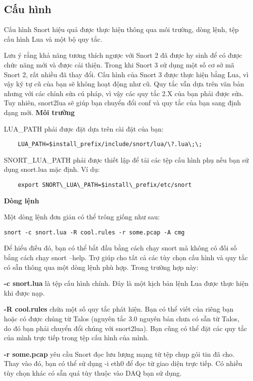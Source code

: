 \subsection{Cấu hình}
Cấu hình Snort hiệu quả được thực hiện thông qua môi trường, dòng lệnh, tệp cấu hình Lua và một bộ quy tắc.
\par
Lưu ý rằng khả năng tương thích ngược với Snort 2 đã được hy sinh để có được chức năng mới và được cải thiện. 
Trong khi Snort 3 sử dụng một số cơ sở mã Snort 2, rất nhiều đã thay đổi. 
Cấu hình của Snort 3 được thực hiện bằng Lua, vì vậy ký tự cũ của bạn sẽ không hoạt động như cũ. 
Quy tắc vẫn dựa trên văn bản nhưng với các chỉnh sửa cú pháp, vì vậy các quy tắc 2.X của bạn phải được sửa. 
Tuy nhiên, snort2lua sẽ giúp bạn chuyển đổi conf và quy tắc của bạn sang định dạng mới.
\newline
\newline
\textbf{Môi trường}
\par
LUA\_PATH phải được đặt dựa trên cài đặt của bạn:
\begin{lstlisting}
    LUA_PATH=$install_prefix/include/snort/lua/\?.lua\;\;
\end{lstlisting}
\par
SNORT\_LUA\_PATH phải được thiết lập để tải các tệp cấu hình phụ nếu bạn sử dụng snort.lua mặc định. Ví dụ:
\begin{lstlisting}
    export SNORT\_LUA\_PATH=$install\_prefix/etc/snort
\end{lstlisting}
\textbf{Dòng lệnh}
\par
Một dòng lệnh đơn giản có thể trông giống như sau:
\begin{lstlisting}
snort -c snort.lua -R cool.rules -r some.pcap -A cmg
\end{lstlisting}
Để hiểu điều đó, bạn có thể bắt đầu bằng cách chạy snort mà không có đối số bằng cách chạy snort --help. Trợ giúp cho tất cả các tùy chọn cấu hình và quy tắc có sẵn thông qua một dòng lệnh phù hợp. Trong trường hợp này:

\textbf{-c snort.lua} là tệp cấu hình chính. Đây là một kịch bản lệnh Lua được thực hiện khi được nạp.

\textbf{-R cool.rules} chứa một số quy tắc phát hiện. Bạn có thể viết của riêng bạn hoặc có được chúng từ Talos (nguyên tắc 3.0 nguyên bản chưa có sẵn từ Talos, do đó bạn phải chuyển đổi chúng với snort2lua). Bạn cũng có thể đặt các quy tắc của mình trực tiếp trong tệp cấu hình của mình.

\textbf{-r some.pcap} yêu cầu Snort đọc lưu lượng mạng từ tệp chụp gói tin đã cho. Thay vào đó, bạn có thể sử dụng -i eth0 để đọc từ giao diện trực tiếp. Có nhiều tùy chọn khác có sẵn quá tùy thuộc vào DAQ bạn sử dụng.

